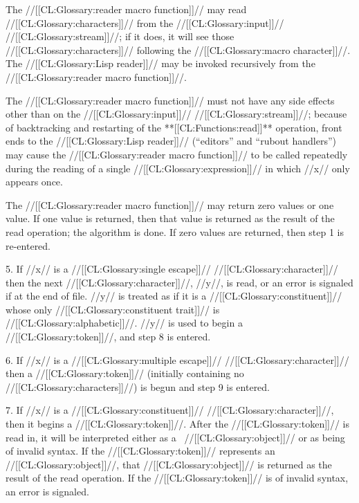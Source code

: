 The //[[CL:Glossary:reader macro function]]// may read //[[CL:Glossary:characters]]// 
from the //[[CL:Glossary:input]]// //[[CL:Glossary:stream]]//; 
if it does, it will see those //[[CL:Glossary:characters]]// following the //[[CL:Glossary:macro character]]//.
The //[[CL:Glossary:Lisp reader]]// may be invoked recursively from the //[[CL:Glossary:reader macro function]]//.


The //[[CL:Glossary:reader macro function]]// must not have any side effects other than on the
//[[CL:Glossary:input]]// //[[CL:Glossary:stream]]//;
because of backtracking and restarting of the **[[CL:Functions:read]]** operation,
front ends to the //[[CL:Glossary:Lisp reader]]// (\eg ``editors'' and ``rubout handlers'') 
may cause the //[[CL:Glossary:reader macro function]]// to be called repeatedly during the
reading of a single //[[CL:Glossary:expression]]// in which //x// only appears once.


The //[[CL:Glossary:reader macro function]]// may return zero values or one value.
If one value is returned,
then that value is returned as the result of the read operation;
the algorithm is done.
If zero values are returned, then step 1 is re-entered.


\item{5.}
If //x// is a //[[CL:Glossary:single escape]]// //[[CL:Glossary:character]]//
then the next //[[CL:Glossary:character]]//, //y//, is read, or an error  
is signaled if at the end of file.
//y// is treated as if it is a //[[CL:Glossary:constituent]]// 
whose only //[[CL:Glossary:constituent trait]]// is //[[CL:Glossary:alphabetic]]//.
//y// is used to begin a //[[CL:Glossary:token]]//, and step 8 is entered.


\item{6.}
If //x// is a //[[CL:Glossary:multiple escape]]// //[[CL:Glossary:character]]//
then a //[[CL:Glossary:token]]// (initially
containing no //[[CL:Glossary:characters]]//) is  begun and step 9 is entered.


\item{7.}
If //x// is a //[[CL:Glossary:constituent]]// //[[CL:Glossary:character]]//, then it begins a //[[CL:Glossary:token]]//.
After the //[[CL:Glossary:token]]// is read in, it will be interpreted
either as a \Lisp\ //[[CL:Glossary:object]]// or as being of invalid syntax.
If the //[[CL:Glossary:token]]// represents an //[[CL:Glossary:object]]//,
that //[[CL:Glossary:object]]// is returned as the result of the read operation.
If the //[[CL:Glossary:token]]// is of invalid syntax, an error is signaled.



